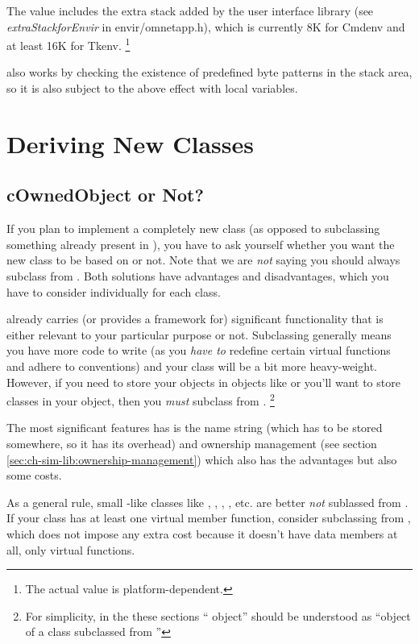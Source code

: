 The value includes the extra stack added by the user interface library
(see \textit{extraStackforEnvir} in
envir/omnetapp.h), which is currently 8K for Cmdenv and at least 16K
for Tkenv.
  \footnote{The actual value is platform-dependent.}

also works by checking the existence of predefined
byte patterns in the stack area, so it is also subject to the above
effect with local variables.



\section{Deriving New Classes}
\label{sec:ch-sim-lib:deriving-new-classes}

\subsection{cOwnedObject or Not?}

If you plan to implement a completely new class (as opposed to
subclassing something already present in {\opp}), you have
to ask yourself whether you want the new class to be based
on  or not.
Note that we are \textit{not} saying you should always
subclass from .
Both solutions have advantages and disadvantages, which you
have to consider individually for each class.

 already carries (or provides a framework for)
significant functionality that is either relevant to
your particular purpose or not. Subclassing 
generally means you have more code to write (as you \textit{have to}
redefine certain virtual functions and adhere to conventions)
and your class will be a bit more heavy-weight.
However, if you need to store your objects in {\opp} objects like 
or you'll want to store {\opp} classes in your object,
then you \textit{must} subclass from .
  \footnote{For simplicity, in the these sections ``{\opp} object''
  should be understood as ``object of a class subclassed from
  ''}

The most significant features  has is
the name string (which has to be stored somewhere, so it has
its overhead) and ownership management (see section
\ref{sec:ch-sim-lib:ownership-management}) which
also has the advantages but also some costs.

As a general rule, small -like classes like ,
, , , etc.
are better \textit{not} sublassed from .
If your class has at least one virtual member function, consider
subclassing from , which does not impose any
extra cost because it doesn't have data members at all, only
virtual functions.


